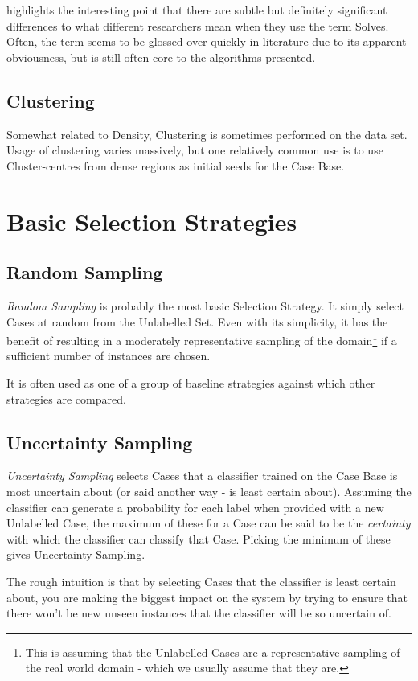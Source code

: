\documentclass[a4paper,11pt]{report}
\begin{document}
\citet{BridgeUpcoming} highlights the interesting point that there are subtle but definitely significant differences to what different researchers mean when they use the term Solves. Often, the term seems to be glossed over quickly in literature due to its apparent obviousness, but is still often core to the algorithms presented.

\subsection{Clustering}
Somewhat related to Density, Clustering is sometimes performed on the data set. Usage of clustering varies massively, but one relatively common use is to use Cluster-centres from dense regions as initial seeds for the Case Base.

\section{Basic Selection Strategies}
\subsection{Random Sampling}
\emph{Random Sampling} is probably the most basic Selection Strategy. It simply select Cases at random from the Unlabelled Set. Even with its simplicity, it has the benefit of resulting in a moderately representative sampling of the domain\footnote{This is assuming that the Unlabelled Cases are a representative sampling of the real world domain - which we usually assume that they are.} if a sufficient number of instances are chosen.

It is often used as one of a group of baseline strategies against which other strategies are compared.

\subsection{Uncertainty Sampling}
\emph{Uncertainty Sampling} \citep{Lewis1994} selects Cases that a classifier trained on the Case Base is most uncertain about (or said another way - is least certain about). Assuming the classifier can generate a probability for each label when provided with a new Unlabelled Case, the maximum of these for a Case can be said to be the \emph{certainty} with which the classifier can classify that Case. Picking the minimum of these gives Uncertainty Sampling.

The rough intuition is that by selecting Cases that the classifier is least certain about, you are making the biggest impact on the system by trying to ensure that there won't be new unseen instances that the classifier will be so uncertain of.
\end{document}
